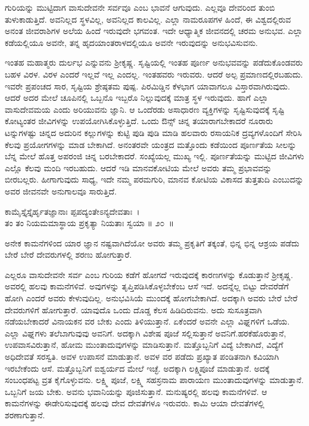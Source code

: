 ಗುರಿಯನ್ನು ಮುಟ್ಟಿದಾಗ ವಾಸುದೇವನೇ ಸರ್ವವೂ ಎಂಬ ಭಾವನೆ ಆಗುವುದು. ಎಲ್ಲವೂ ದೇವರಿಂದ ತುಂಬಿ ತುಳುಕಾಡುತ್ತಿದೆ. ಅವನಿಲ್ಲದ ಸ್ಥಳವಿಲ್ಲ, ಅವನಿಲ್ಲದ ಕಾಲವಿಲ್ಲ. ಎಲ್ಲಾ ನಾಮರೂಪಗಳ ಹಿಂದೆ, ಈ ವಿಶ್ವದಲ್ಲಿರುವ ಅನಂತ ಜೀವರಾಶಿಗಳ ಅಲೆಯ ಹಿಂದೆ ಇರುವುದೇ ಭಗವಂತ. ಇದೇ ಆಧ್ಯಾತ್ಮಿಕ ಜೀವನದಲ್ಲಿ ಚರಮ ಅನುಭವ. ಎಲ್ಲಾ ಕಡೆಯಲ್ಲಿಯೂ ಅವನೇ, ತನ್ನ ಹೃದಯಾಂತರಾಳದಲ್ಲಿಯೂ ಅವನೇ ಇರುವುದನ್ನು ಅನುಭವಿಸುವನು.

ಇಂತಹ ಮಹಾತ್ಮರು ದುರ್ಲಭ ಎನ್ನುವನು ಶ‍್ರೀಕೃಷ್ಣ. ಸೃಷ್ಟಿಯಲ್ಲಿ ಇಂತಹ ಪೂರ್ಣ ಅನುಭವವನ್ನು ಪಡೆದುಕೊಂಡವರು ಬಹಳ ವಿರಳ. ವಿರಳ ಎಂದರೆ ಇಲ್ಲವೆ ಇಲ್ಲ ಎಂದಲ್ಲ. ಇಂತಹವರು ಇರುವರು. ಆದರೆ ಅಲ್ಪ ಪ್ರಮಾಣದಲ್ಲಿರಬಹುದು. ಇವರೇ ಪ್ರಪಂಚದ ಸಾರ, ಸೃಷ್ಟಿಯ ಶ್ರೇಷ್ಠತಮ ಪುಷ್ಪ. ಪಿರಮಿಡ್ಡಿನ ಕೆಳಭಾಗ ಯಾವಾಗಲೂ ವಿಸ್ತಾರವಾಗಿರುವುದು. ಆದರೆ ಅದರ ಮೇಲೆ ಚೂಪಿನಲ್ಲಿ ಒಬ್ಬನೊ ಇಬ್ಬರೊ ನಿಲ್ಲುವುದಕ್ಕೆ ಮಾತ್ರ ಸ್ಥಳ ಇರುವುದು. ಹಾಗೆ ಎಲ್ಲಾ ವಾಸುದೇವಮಯ ಎಂದು ಅರಿಯುವನು ಜ್ಞಾನಿ. ಆ ಒಂದೆರಡು ಅಸಾಧಾರಣ ವ್ಯಕ್ತಿಗಳನ್ನು ಸೃಷ್ಟಿಸುವುದಕ್ಕೆ ಸೃಷ್ಟಿ ಕೋಟ್ಯಂತರ ಜೀವಿಗಳನ್ನು ಉಪಯೋಗಿಸಿಕೊಳ್ಳುತ್ತಿದೆ. ಒಂದು ಔನ್ಸ್ ಚಿನ್ನ ತಯಾರಾಗಬೇಕಾದರೆ ನೂರಾರು ಟನ್ನುಗಳಷ್ಟು ಚಿನ್ನದ ಅದುರಿನ ಕಲ್ಲುಗಳನ್ನು ಕುಟ್ಟಿ ಪುಡಿ ಪುಡಿ ಮಾಡಿ ಹಲವಾರು ರಸಾಯನಿಕ ದ್ರವ್ಯಗಳೊಂದಿಗೆ ಸೇರಿಸಿ ಕೆಲವು ಪ್ರಯೋಗಗಳನ್ನು ಮಾಡ ಬೇಕಾಗಿದೆ. ಅನಂತರವೇ ಯಂತ್ರದ ಮತ್ತೊಂದು ಕಡೆಯಿಂದ ಪೂರ್ಣತೆಯ ಸೀಲನ್ನು ಬೆನ್ನ ಮೇಲೆ ಹೊತ್ತ ಅಪರಂಜಿ ಚಿನ್ನ ಬರಬೇಕಾದರೆ. ಸಂಖ್ಯೆಯಲ್ಲ ಮುಖ್ಯ ಇಲ್ಲಿ. ಪೂರ್ಣತೆಯನ್ನು ಮುಟ್ಟಿದ ಜೀವಿಗಳು ಎಲ್ಲೊ ಕೆಲವು ಮಂದಿ ಇರಬಹುದು. ಆದರೆ ಇಡಿ ಮಾನವಕೋಟಿಯ ಮೇಲೆ ಅವರು ತಮ್ಮ ಪ್ರಭಾವವನ್ನು ಬೀರಬಲ್ಲರು. ಹೀಗಾಗುವುದು ಸಾಧ್ಯ, ಇದೇ ನಮ್ಮ ಪರಮಗುರಿ, ಮಾನವ ಕೋಟಿಯ ವಿಕಾಸದ ತುತ್ತತುದಿ ಎಂಬುದನ್ನು ಅವರ ಜೀವನವೇ ಅನುಗಾಲವೂ ಸಾರುತ್ತಿದೆ.

\begin{shloka}
ಕಾಮೈಸ್ತೈಸ್ತೈರ್ಹೃತಜ್ಞಾನಾಃ ಪ್ಪಪದ್ಯಂತೇಽನ್ಯದೇವತಾಃ~।\\ತಂ ತಂ ನಿಯಮಮಾಸ್ಥಾಯ ಪ್ರಕೃತ್ಯಾ ನಿಯತಾಃ ಸ್ವಯಾ \hfill॥ ೨೦~॥
\end{shloka}

\begin{artha}
ಅನೇಕ ಕಾಮನೆಗಳಿಂದ ಯಾರ ಜ್ಞಾನ ನಷ್ಟವಾಗಿದೆಯೋ ಅವರು ತಮ್ಮ ಪ್ರಕೃತಿಗೆ ತಕ್ಕಂತೆ, ಭಿನ್ನ ಭಿನ್ನ ಆಶ್ರಯ ಪಡೆದು ಬೇರೆ ಬೇರೆ ದೇವರುಗಳಲ್ಲಿ ಶರಣು ಹೋಗುತ್ತಾರೆ.
\end{artha}

ಎಲ್ಲರೂ ವಾಸುದೇವನೇ ಸರ್ವ ಎಂಬ ಗುರಿಯ ಕಡೆಗೆ ಹೋಗದೆ ಇರುವುದಕ್ಕೆ ಕಾರಣಗಳನ್ನು ಕೊಡುತ್ತಾನೆ ಶ‍್ರೀಕೃಷ್ಣ. ಅವರಲ್ಲಿ ಹಲವು ಕಾಮನೆಗಳಿವೆ. ಅವುಗಳನ್ನು ತೃಪ್ತಿಪಡಿಸಿಕೊಳ್ಳಬೇಕೆಂಬ ಆಸೆ ಇದೆ. ಅದನ್ನೆಲ್ಲ ಬಿಟ್ಟು ದೇವರೆಡೆಗೆ ಹೋಗಿ ಎಂದರೆ ಅವರು ಕೇಳುವುದಿಲ್ಲ. ಅನುಭವಿಸಿಯೆ ಮುಂದಕ್ಕೆ ಹೋಗಬೇಕಾಗಿದೆ. ಅದಕ್ಕಾಗಿ ಅವರು ಬೇರೆ ಬೇರೆ ದೇವರುಗಳಿಗೆ ಹೋಗುತ್ತಾರೆ. ಯಾವುದೊ ಒಂದು ದೊಡ್ಡ ಕೆಲಸ ಹಿಡಿದಿರುವನು. ಅದು ಸುಸೂತ್ರವಾಗಿ ನಡೆಯಬೇಕಾದರೆ ವಿನಾಯಕನ ವರ ಬೇಕು ಎಂದು ತಿಳಿಯುತ್ತಾನೆ. ಏಕೆಂದರೆ ಅವನೇ ಎಲ್ಲಾ ವಿಘ್ನಗಳಿಗೆ ಒಡೆಯ. ಎಲ್ಲಾ ವಿಘ್ನಗಳು ತಲೆಬಾಗುವುವು ಅವನಿಗೆ. ಅದಕ್ಕಾಗಿ ವಿಶೇಷ ಪೂಜೆ ಸಲ್ಲಿಸುತ್ತಾನೆ ಅವನಿಗೆ.\break ಹರಕೆಹೊರುತ್ತಾನೆ, ಉಪವಾಸವಿರುತ್ತಾನೆ, ಹೋಮ ಮುಂತಾದುವುಗಳನ್ನು ಮಾಡಿಸುತ್ತಾನೆ. ಮತ್ತೊಬ್ಬನಿಗೆ ವಿದ್ಯೆ ಬೇಕಾಗಿದೆ, ವಿದ್ಯೆಗೆ ಅಧಿದೇವತೆ ಸರಸ್ವತಿ. ಅವಳ ಉಪಾಸನೆ ಮಾಡುತ್ತಾನೆ. ಅವಳ ವರ ಪಡೆದು ಪ್ರಖ್ಯಾತ ಪಂಡಿತನಾಗಿ ಕವಿಯಾಗಿ ಇರಬೇಕೆಂದು ಆಸೆ. ಮತ್ತೊಬ್ಬನಿಗೆ ಐಶ್ವರ್ಯದ ಮೇಲೆ ಇಚ್ಛೆ. ಅದಕ್ಕಾಗಿ ಲಕ್ಷ್ಮಿಪೂಜೆ ಮಾಡುತ್ತಾನೆ. ಅದಕ್ಕೆ ಸಂಬಂಧಪಟ್ಟ ವ್ರತ ಕೈಗೊಳ್ಳುವನು. ಲಕ್ಷ್ಮಿ ಪೂಜೆ, ಲಕ್ಷ್ಮಿ ಸಹಸ್ರನಾಮ ಪಾರಾಯಣ ಮುಂತಾದುವುಗಳನ್ನು ಮಾಡುತ್ತಾನೆ. ಒಬ್ಬನಿಗೆ ಜಯ ಬೇಕು. ಅವನು ಭವಾನಿಯನ್ನು ಪೂಜಿಸುತ್ತಾನೆ. ಮನುಷ್ಯರಲ್ಲಿ ಹಲವು ಕಾಮನೆಗಳಿವೆ. ಆ ಕಾಮನೆಗಳನ್ನು ಈಡೇರಿಸುವುದಕ್ಕೆ ಹಲವು ದೇವ ದೇವತೆಗಳೂ ಇರುವರು. ಕಾಮಿ ಆಯಾ ದೇವತೆಗಳಲ್ಲಿ ಶರಣಾಗುತ್ತಾನೆ.

